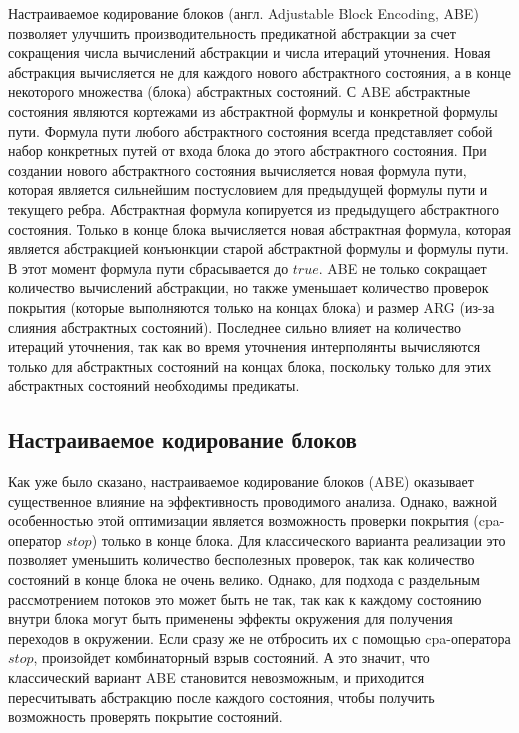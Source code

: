 Настраиваемое кодирование блоков (англ. Adjustable Block Encoding, ABE)~\cite{Beyer10} позволяет улучшить производительность предикатной абстракции за счет сокращения числа вычислений абстракции и числа итераций уточнения.
Новая абстракция вычисляется не для каждого нового абстрактного состояния, а в конце некоторого множества (блока) абстрактных состояний.
С ABE абстрактные состояния являются кортежами из абстрактной формулы и конкретной формулы пути.
Формула пути любого абстрактного состояния всегда представляет собой набор конкретных путей от входа блока до этого абстрактного состояния.
При создании нового абстрактного состояния вычисляется новая формула пути, которая является сильнейшим постусловием для предыдущей формулы пути и текущего ребра. Абстрактная формула копируется из предыдущего абстрактного состояния. 
Только в конце блока вычисляется новая абстрактная формула, которая является абстракцией конъюнкции старой абстрактной формулы и формулы пути.
В этот момент формула пути сбрасывается до $true$.
ABE не только сокращает количество вычислений абстракции, но также уменьшает количество проверок покрытия (которые выполняются только на концах блока) и размер ARG (из-за слияния абстрактных состояний).
Последнее сильно влияет на количество итераций уточнения, так как во время уточнения интерполянты вычисляются только для абстрактных состояний на концах блока, поскольку только для этих абстрактных состояний необходимы предикаты.

\subsection{Настраиваемое кодирование блоков}
\label{sect_predicate_abe}
Как уже было сказано, настраиваемое кодирование блоков (ABE) оказывает существенное влияние на эффективность проводимого анализа.
Однако, важной особенностью этой оптимизации является возможность проверки покрытия (cpa-оператор $stop$) только в конце блока. 
Для классического варианта реализации это позволяет уменьшить количество бесполезных проверок, так как количество состояний в конце блока не очень велико.
Однако, для подхода с раздельным рассмотрением потоков это может быть не так, так как к каждому состоянию внутри блока могут быть применены эффекты окружения для получения переходов в окружении. 
Если сразу же не отбросить их с помощью cpa-оператора $stop$, произойдет комбинаторный взрыв состояний.
А это значит, что классический вариант ABE становится невозможным, и приходится пересчитывать абстракцию после каждого состояния, чтобы получить возможность проверять покрытие состояний.

